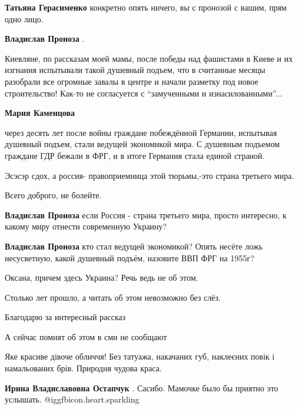 \begin{itemize}
\begin{itemize}
\begin{itemize}
\textbf{Татьяна Герасименко} конкретно опять ничего, вы с пронозой с вашим, прям одно лицо.
\end{itemize} %

\textbf{Владислав Проноза} . 

Киевляне, по рассказам моей мамы, после победы над фашистами в Киеве и их
изгнания испытывали такой душевный подъем, что в считанные месяцы разобрали все
огромные завалы в центре и начали разметку под новое строительство! Как-то не
согласуется с \enquote{замученными и изнасилованными}...

\begin{itemize} %
\textbf{Мария Каменцова} 

через десять лет после войны граждане побеждённой Германии, испытывая душевный
подъем, стали ведущей экономикой мира. С душевным подъемом граждане ГДР бежали в
ФРГ, и в итоге Германия стала единой страной.

Эсэсэр сдох, а россия- правоприемница этой тюрьмы,-это страна третьего мира.

Всего доброго, не болейте.

\textbf{Владислав Проноза} если Россия - страна третьего мира, просто интересно, к какому миру отнести современную Украину?

\textbf{Владислав Проноза} кто стал ведущей экономикой? Опять несёте ложь несусветную, какой душевный подъём, назовите ВВП ФРГ на 1955г?

Оксана, причем здесь Украина? Речь ведь не об этом.
\end{itemize} %


\end{itemize} %

Столько лет прошло, а читать об этом невозможно без слёз.

Благодарю за интересный рассказ

А сейчас помнят об этом в сми не сообщают


Яке красиве дівоче обличчя! Без татуажа, накачаних губ, наклеєних повік і
намальованих брів. Природня чудова краса.

\begin{itemize} %
\textbf{Ирина Владиславовна Остапчук} . Сасибо. Мамочке было бы приятно это услышать.  @igg{fbicon.heart.sparkling} 
\end{itemize} %

\end{itemize} %
